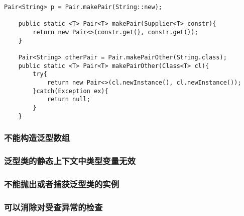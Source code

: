  \begin{lstlisting}[style=cjava,label=useless]
    Pair<String> p = Pair.makePair(String::new);

    public static <T> Pair<T> makePair(Supplier<T> constr){
        return new Pair<>(constr.get(), constr.get());
    }

    Pair<String> otherPair = Pair.makePairOther(String.class);
    public static <T> Pair<T> makePairOther(Class<T> cl){
        try{
            return new Pair<>(cl.newInstance(), cl.newInstance());
        }catch(Exception ex){
            return null;
        }
    }
 \end{lstlisting}

 \subsubsection{不能构造泛型数组}
 \subsubsection{泛型类的静态上下文中类型变量无效}

 \subsubsection{不能抛出或者捕获泛型类的实例}

 \subsubsection{可以消除对受查异常的检查}
 





